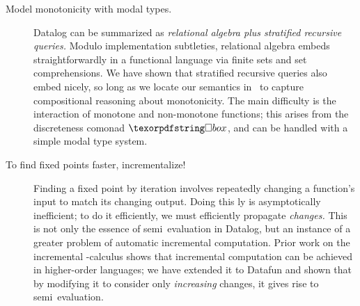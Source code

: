 \begin{description}
\item[Model monotonicity with modal types.]
  Datalog can be summarized as \emph{relational algebra plus stratified
  recursive queries.} Modulo implementation subtleties, relational algebra
  embeds straightforwardly in a functional language via finite sets and set
  comprehensions. We have shown that stratified recursive queries also embed
  nicely, so long as we locate our semantics in \Poset\ to capture compositional
  reasoning about monotonicity.
  The main difficulty is the interaction of monotone and non-monotone functions;
  this arises from the discreteness comonad $\iso$, and can be handled with
  a simple modal type system.

\item[{To find fixed points faster, incrementalize!}] Finding a fixed point by
  iteration involves repeatedly changing a function's input to match its
  changing output. Doing this \naive{}ly is asymptotically inefficient; to do it
  efficiently, we must efficiently propagate \emph{changes.}
%
  This is not only the essence of semi\naive\ evaluation in Datalog, but an
  instance of a greater problem of automatic incremental computation.
%
  Prior work on the incremental \fn-calculus shows that incremental
  computation can be achieved in higher-order languages; we have extended it to
  Datafun and shown that by modifying it to consider only \emph{increasing}
  changes, it gives rise to semi\naive\ evaluation.

\end{description}
